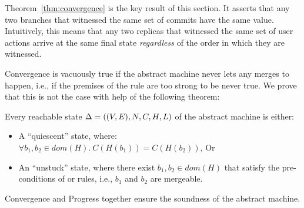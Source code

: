 Theorem~\ref{thm:convergence} is the key result of this section. It
asserts that any two branches that witnessed the same set of commits
have the same value. Intuitively, this means that any two replicas
that witnessed the same set of user actions arrive at the same final
state \emph{regardless} of the order in which they are witnessed. 

Convergence is vacuously true if the abstract machine never lets any
merges to happen, i.e., if the premises of the  rule
are too strong to be never true. We prove that this is not the case
with help of the following theorem:

\begin{theorem}[{\bf Progress}]
  \label{thm:progress}
  Every reachable state $\Delta = ((V,E),\\N,C,H,L)$ of the abstract
  machine is either: 
  \begin{itemize}
    \item A ``quiescent'' state, where: $\forall b_1,b_2 \in
      dom(H).~C(H(b_1)) = C(H(b_2))$, Or
    \item An ``unstuck'' state, where there exist $b_1,b_2 \in dom(H)$
      that satisfy the pre-conditions of  or
       rules, i.e., $b_1$ and $b_2$ are mergeable. 
  \end{itemize}
\end{theorem}

Convergence and Progress together ensure the soundness of the \quark
abstract machine. 

